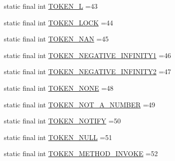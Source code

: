 \begin{DoxyCompactItemize}
\item 
static final int \hyperlink{classgov_1_1nasa_1_1jpf_1_1inspector_1_1server_1_1expression_1_1parser_1_1_expression_grammar_lexer_a57b177ac69a2726059f7089119c8c210}{T\+O\+K\+E\+N\+\_\+L} =43
\item 
static final int \hyperlink{classgov_1_1nasa_1_1jpf_1_1inspector_1_1server_1_1expression_1_1parser_1_1_expression_grammar_lexer_a8e4a46854b4803dc0f4dd06be0cda87d}{T\+O\+K\+E\+N\+\_\+\+L\+O\+CK} =44
\item 
static final int \hyperlink{classgov_1_1nasa_1_1jpf_1_1inspector_1_1server_1_1expression_1_1parser_1_1_expression_grammar_lexer_afb8076a212c0731a92bc0af63a384943}{T\+O\+K\+E\+N\+\_\+\+N\+AN} =45
\item 
static final int \hyperlink{classgov_1_1nasa_1_1jpf_1_1inspector_1_1server_1_1expression_1_1parser_1_1_expression_grammar_lexer_a9a25c68808447fadddce156171b8588f}{T\+O\+K\+E\+N\+\_\+\+N\+E\+G\+A\+T\+I\+V\+E\+\_\+\+I\+N\+F\+I\+N\+I\+T\+Y1} =46
\item 
static final int \hyperlink{classgov_1_1nasa_1_1jpf_1_1inspector_1_1server_1_1expression_1_1parser_1_1_expression_grammar_lexer_a4c1f3582dbd3c3382557c2bc57c9edcc}{T\+O\+K\+E\+N\+\_\+\+N\+E\+G\+A\+T\+I\+V\+E\+\_\+\+I\+N\+F\+I\+N\+I\+T\+Y2} =47
\item 
static final int \hyperlink{classgov_1_1nasa_1_1jpf_1_1inspector_1_1server_1_1expression_1_1parser_1_1_expression_grammar_lexer_aacf77e6cadc506fa6a142ee66c43bea2}{T\+O\+K\+E\+N\+\_\+\+N\+O\+NE} =48
\item 
static final int \hyperlink{classgov_1_1nasa_1_1jpf_1_1inspector_1_1server_1_1expression_1_1parser_1_1_expression_grammar_lexer_aad3951c250d9f6d5ae73cc11e2b715b8}{T\+O\+K\+E\+N\+\_\+\+N\+O\+T\+\_\+\+A\+\_\+\+N\+U\+M\+B\+ER} =49
\item 
static final int \hyperlink{classgov_1_1nasa_1_1jpf_1_1inspector_1_1server_1_1expression_1_1parser_1_1_expression_grammar_lexer_a9cf7328ee5005c45528e949cb8c63452}{T\+O\+K\+E\+N\+\_\+\+N\+O\+T\+I\+FY} =50
\item 
static final int \hyperlink{classgov_1_1nasa_1_1jpf_1_1inspector_1_1server_1_1expression_1_1parser_1_1_expression_grammar_lexer_af93f9e4e2c92cf495418e06ed9f2f147}{T\+O\+K\+E\+N\+\_\+\+N\+U\+LL} =51
\item 
static final int \hyperlink{classgov_1_1nasa_1_1jpf_1_1inspector_1_1server_1_1expression_1_1parser_1_1_expression_grammar_lexer_a9f3293d3ae4b201d0d909a485364c32c}{T\+O\+K\+E\+N\+\_\+\+M\+E\+T\+H\+O\+D\+\_\+\+I\+N\+V\+O\+KE} =52
\item 

\end{DoxyCompactItemize}
